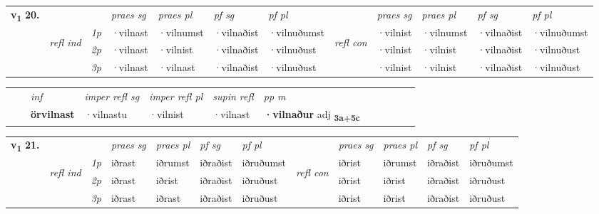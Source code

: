 \begin{tabular}{llllllllllll} \toprule
\multirow{4}{*}{{{\textbf{v{\textsubscript{1}}} \Large{\textbf{20.}}}}}  & &   &  \textit{praes sg}  & \textit{praes pl}  &\textit{pf sg} & \textit{pf pl} &  &  \textit{praes sg}  & \textit{praes pl}  & \textit{pf sg} & \textit{pf pl } \\*
	\cmidrule{4-7} \cmidrule{9-12}
 &\multirow{3}{*}{\begin{turn}{90}\textit{refl ind}\end{turn}} & {\textit{1p}} & ·vilnast & ·vilnumst    & ·vilnaðist & ·vilnuðumst & \multirow{3}{*}{\begin{turn}{90}\textit{refl con}\end{turn}}  &·vilnist & ·vilnumst & ·vilnaðist & ·vilnuðumst\\*
 &&  {\textit{2p}} &  ·vilnast  & ·vilnist   & ·vilnaðist & ·vilnuðust & &·vilnist & ·vilnist & ·vilnaðist & ·vilnuðust \\*
& &  {\textit{3p}} & ·vilnast & ·vilnast   & ·vilnaðist & ·vilnuðust & & ·vilnist & ·vilnist& ·vilnaðist & ·vilnuðust  \\*
\cmidrule{4-7} \cmidrule{9-12}
\end{tabular}


\begin{tabular}{llllllllllll}
 & & \textit{inf}   & \textit{imper refl sg} & \textit{imper refl pl}   & \textit{supin refl} & \textit{pp m}     \\*
  & & \textbf{örvilnast}    & ·vilnastu & ·vilnist   & ·vilnast & \textbf{·vilnaður} adj \textbf{\textsubscript{3a+5c}} \\*
\cmidrule{1-12}
\end{tabular}



\begin{tabular}{llllllllllll} \toprule
\multirow{4}{*}{{{\textbf{v{\textsubscript{1}}} \Large{\textbf{21.}}}}}  & &   &  \textit{praes sg}  & \textit{praes pl}  &\textit{pf sg} & \textit{pf pl} &  &  \textit{praes sg}  & \textit{praes pl}  & \textit{pf sg} & \textit{pf pl } \\*
	\cmidrule{4-7} \cmidrule{9-12}
 &\multirow{3}{*}{\begin{turn}{90}\textit{refl ind}\end{turn}} & {\textit{1p}} & iðrast & iðrumst    & iðraðist & iðruðumst & \multirow{3}{*}{\begin{turn}{90}\textit{refl con}\end{turn}}  &iðrist & iðrumst & iðraðist & iðruðumst\\*
 &&  {\textit{2p}} &  iðrast  & iðrist   & iðraðist & iðruðust & &iðrist & iðrist & iðraðist & iðruðust \\*
& &  {\textit{3p}} & iðrast & iðrast   & iðraðist & iðruðust & & iðrist & iðrist& iðraðist & iðruðust  \\*
\cmidrule{4-7} \cmidrule{9-12}
\end{tabular}


